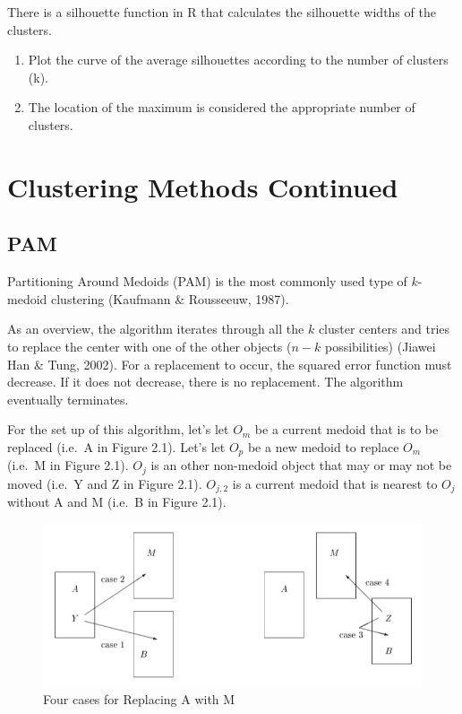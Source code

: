 \documentclass[12pt,twoside]{amherstthesis}
\begin{document}
  There is a silhouette function in R that calculates the silhouette
  widths of the clusters.
  
  \begin{enumerate}
  \def\labelenumi{\arabic{enumi}.}
  \setcounter{enumi}{2}
  \item
    Plot the curve of the average silhouettes according to the number of
    clusters (k).
  \item
    The location of the maximum is considered the appropriate number of
    clusters.
  \end{enumerate}
  
  \chapter{Clustering Methods Continued}\label{typeset-equ}
  
  \section{PAM}\label{pam}
  
  Partitioning Around Medoids (PAM) is the most commonly used type of
  \(k\)-medoid clustering (Kaufmann \& Rousseeuw, 1987).
  
  As an overview, the algorithm iterates through all the \(k\) cluster
  centers and tries to replace the center with one of the other objects
  (\(n-k\) possibilities) (Jiawei Han \& Tung, 2002). For a replacement to
  occur, the squared error function must decrease. If it does not
  decrease, there is no replacement. The algorithm eventually terminates.
  
  For the set up of this algorithm, let's let \(O_m\) be a current medoid
  that is to be replaced (i.e.~A in Figure 2.1). Let's let \(O_p\) be a
  new medoid to replace \(O_m\) (i.e.~M in Figure 2.1). \(O_j\) is an
  other non-medoid object that may or may not be moved (i.e.~Y and Z in
  Figure 2.1). \(O_{j,2}\) is a current medoid that is nearest to \(O_j\)
  without A and M (i.e.~B in Figure 2.1).
  
  \begin{figure}[htbp]
  \centering
  \includegraphics[scale = 0.5,angle = 0]{PAM_pic.png}
  \caption[Four cases for Replacing A with M]{\normalsize{Four cases for Replacing A with M}}
  \label{fig:PAM}
  \end{figure}
  
\end{document}
